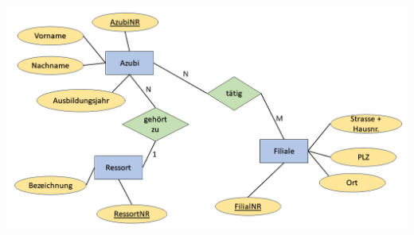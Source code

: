 \documentclass[a4paper,12pt, headsepline, ngerman]{scrartcl}
\begin{document}
	\begin{Answer}[ref=KAERMAufstellen]\\
		\begin{minipage}{\textwidth}\centering
			\includegraphics[width=.95\linewidth]{./pics/KlausurNR4.png}
		\end{minipage}
	\end{Answer}



\newpage
{}
\shipoutAnswer
\end{document}
